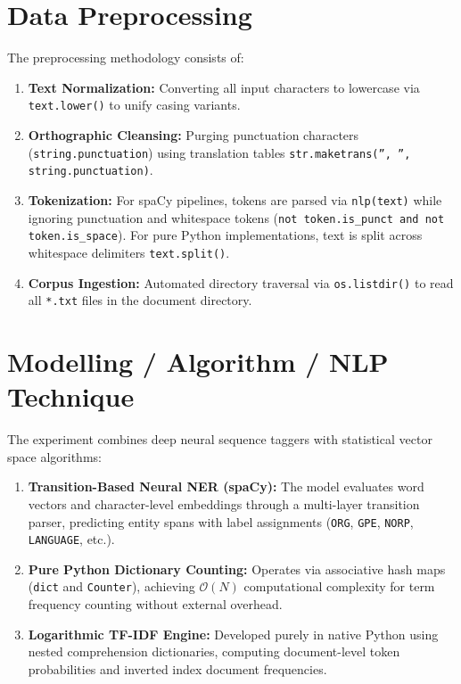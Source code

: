 \section{Data Preprocessing}
The preprocessing methodology consists of:
\begin{enumerate}
    \item \textbf{Text Normalization:} Converting all input characters to lowercase via \texttt{text.lower()} to unify casing variants.
    \item \textbf{Orthographic Cleansing:} Purging punctuation characters (\texttt{string.punctuation}) using translation tables \texttt{str.maketrans('', '', string.punctuation)}.
    \item \textbf{Tokenization:} For spaCy pipelines, tokens are parsed via \texttt{nlp(text)} while ignoring punctuation and whitespace tokens (\texttt{not token.is\_punct and not token.is\_space}). For pure Python implementations, text is split across whitespace delimiters \texttt{text.split()}.
    \item \textbf{Corpus Ingestion:} Automated directory traversal via \texttt{os.listdir()} to read all \texttt{*.txt} files in the document directory.
\end{enumerate}

\section{Modelling / Algorithm / NLP Technique}
The experiment combines deep neural sequence taggers with statistical vector space algorithms:
\begin{enumerate}
    \item \textbf{Transition-Based Neural NER (spaCy):} The model evaluates word vectors and character-level embeddings through a multi-layer transition parser, predicting entity spans with label assignments (\texttt{ORG}, \texttt{GPE}, \texttt{NORP}, \texttt{LANGUAGE}, etc.).
    \item \textbf{Pure Python Dictionary Counting:} Operates via associative hash maps (\texttt{dict} and \texttt{Counter}), achieving $\mathcal{O}(N)$ computational complexity for term frequency counting without external overhead.
    \item \textbf{Logarithmic TF-IDF Engine:} Developed purely in native Python using nested comprehension dictionaries, computing document-level token probabilities and inverted index document frequencies.
\end{enumerate}

